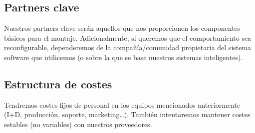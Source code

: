 \subsection{Partners clave}

Nuestros partners clave serán aquellos que nos proporcionen los componentes básicos para el montaje. Adicionalmente, si queremos que el comportamiento sea reconfigurable, dependeremos de la compañía/comunidad propietaria del sistema software que utilicemos (o sobre la que se base nuestros sistemas inteligentes).

\subsection{Estructura de costes}


Tendremos costes fijos de personal en los equipos mencionados anteriormente (I+D, producción, soporte, marketing\dots). También intentaremos mantener costes estables (no variables) con nuestros proveedores.